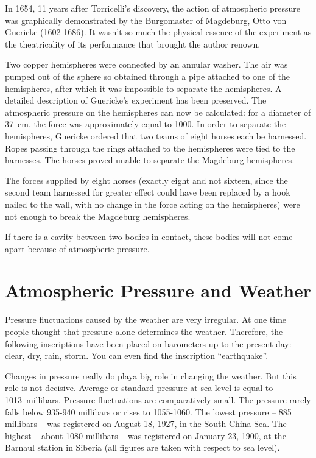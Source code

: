 In 1654, 11 years after Torricelli's discovery, the
action of atmospheric pressure was graphically demonstrated by the Burgomaster of Magdeburg, Otto von Guericke (1602-1686). It wasn't so much the physical essence of the experiment as the theatricality of its performance that brought the author renown.

Two copper hemispheres were connected by an annular
washer. The air was pumped out of the sphere so obtained
through a pipe attached to one of the hemispheres, after
which it was impossible to separate the hemispheres.
A detailed description of Guericke's experiment has been
preserved. The atmospheric pressure on the hemispheres
can now be calculated: for a diameter of \SI{37}{\centi\meter}, the force was approximately equal to \SI{1000}{\kgf}. In order to separate
the hemispheres, Guericke ordered that two teams of
eight horses each be harnessed. Ropes passing through
the rings attached to the hemispheres were tied to the
harnesses. The horses proved unable to separate the
Magdeburg hemispheres.

The forces supplied by eight horses (exactly eight and not sixteen, since the second team harnessed for greater effect could have been replaced by a hook nailed to the wall, with no change in the force acting on the hemispheres) were not enough to break the Magdeburg hemispheres.

If there is a cavity between two bodies in contact, these bodies will not come apart because of atmospheric pressure.

\section{Atmospheric Pressure and Weather}

Pressure fluctuations caused by the weather are very
irregular. At one time people thought that pressure
alone determines the weather. Therefore, the following
inscriptions have been placed on barometers up to the
present day: clear, dry, rain, storm. You can even find
the inscription ``earthquake''.

Changes in pressure really do playa big role in changing the weather. But this role is not decisive. Average or
standard pressure at sea level is equal to 1013~millibars. Pressure fluctuations are comparatively small. The pressure rarely falls below 935-940 millibars or rises to 1055-1060. The lowest pressure -- 885 millibars -- was registered on August 18, 1927, in the South China Sea. The highest -- about 1080 millibars -- was registered on January 23, 1900, at the Barnaul station in Siberia (all figures are taken with respect to sea level).



